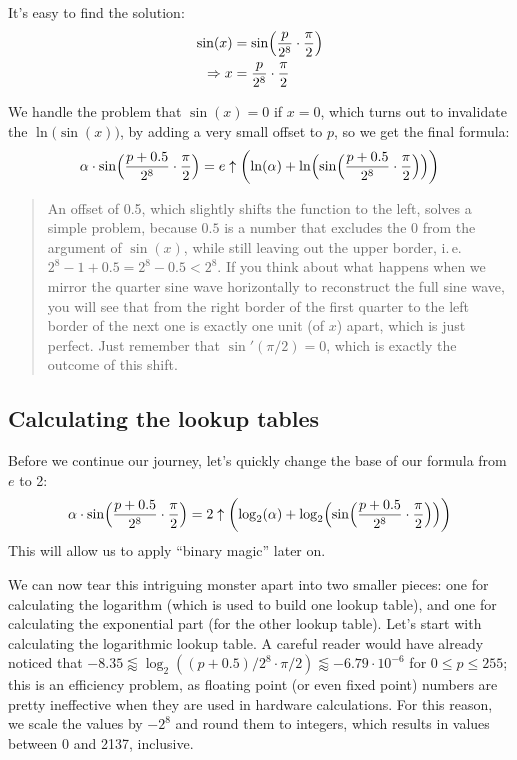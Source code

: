\documentclass[english]{scrartcl}
\newenvironment{details}{
\par\nobreak\noindent%
\begin{quotation}%
  \footnotesize%
  \noindent\Radioactivity%
}{
\end{quotation}
}
\begin{document}
It's easy to find the solution:
\begin{align*}
\sin(x) & = \sin\Bigl( \frac{p}{2^8} \cdot \frac{\pi}{2} \Bigr) \\
\Rightarrow x  & = \frac{p}{2^8} \cdot \frac{\pi}{2}
\end{align*}

We handle the problem that $\sin(x)=0$ if $x=0$, which turns out to invalidate the $\ln\bigl(\sin(x)\bigr)$, by adding a very small offset to $p$, so we get the final formula:
\[ \alpha \cdot \sin\Bigl(\frac{p+0.5}{2^8} \cdot \frac{\pi}{2}\Bigr)
   = e \uparrow \biggl( \ln(\alpha) + \ln\Bigl(\sin\Bigl(\frac{p+0.5}{2^8} \cdot \frac{\pi}{2}\Bigr)\Bigr) \biggr) \]

\begin{details}
An offset of 0.5, which slightly shifts the function to the left, solves a simple problem, because $0.5$ is a number that excludes the 0 from the argument of $\sin(x)$, while still leaving out the upper border, i.\,e.~$2^8-1+0.5 = 2^8 - 0.5 < 2^8$.
If you think about what happens when we mirror the quarter sine wave horizontally to reconstruct the full sine wave, you will see that from the right border of the first quarter to the left border of the next one is exactly one unit (of $x$) apart, which is just perfect.
Just remember that $\sin'(\pi/2) = 0$, which is exactly the outcome of this shift.
\end{details}


\subsection{Calculating the lookup tables}

Before we continue our journey, let's quickly change the base of our formula from $e$ to 2:
\[ \alpha \cdot \sin\Bigl(\frac{p+0.5}{2^8} \cdot \frac{\pi}{2}\Bigr)
   = 2 \uparrow \biggl( \log_2(\alpha) + \log_2\Bigl(\sin\Bigl(\frac{p+0.5}{2^8} \cdot \frac{\pi}{2}\Bigr)\Bigr) \biggr) \]
This will allow us to apply ``binary magic'' later on.

We can now tear this intriguing monster apart into two smaller pieces: one for calculating the logarithm (which is used to build one lookup table), and one for calculating the exponential part (for the other lookup table).
Let's start with calculating the logarithmic lookup table.
A careful reader would have already noticed that $-8.35 \lessapprox \log_2((p+0.5)/2^8 \cdot \pi/2) \lessapprox -6.79\cdot10^{-6}$ for $0 \leq p \leq 255$; this is an efficiency problem, as floating point (or even fixed point) numbers are pretty ineffective when they are used in hardware calculations.
For this reason, we scale the values by $-2^8$ and round them to integers, which results in values between 0 and 2137, inclusive.
\end{document}
